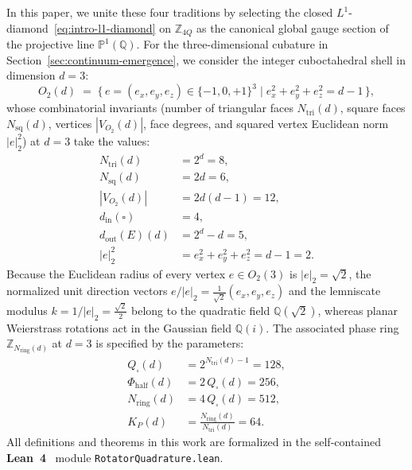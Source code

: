 \documentclass[11pt,a4paper]{article}
\theoremstyle{plain}
\theoremstyle{definition}
\begin{document}
In this paper, we unite these four traditions by selecting the closed $L^1$-diamond~\eqref{eq:intro-l1-diamond} on $\mathbb{Z}_{4Q}$ as the canonical global gauge section of the projective line $\mathbb{P}^1(\mathbb{Q})$. For the three-dimensional cubature in Section~\ref{sec:continuum-emergence}, we consider the integer cuboctahedral shell in dimension $d = 3$:
\begin{equation}
  \label{eq:cuboct-shell-def}
  O_2(d) \;=\; \bigl\{\,e = (e_x, e_y, e_z) \in \{-1, 0, +1\}^3 \;\big|\; e_x^2 + e_y^2 + e_z^2 = d - 1\,\bigr\},
\end{equation}
whose combinatorial invariants (number of triangular faces $N_{\mathrm{tri}}(d)$, square faces $N_{\mathrm{sq}}(d)$, vertices $|V_{O_2}(d)|$, face degrees, and squared vertex Euclidean norm $|e|_2^2$) at $d = 3$ take the values:
\begin{align}
  N_{\mathrm{tri}}(d) &= 2^d = 8, \label{eq:cuboct-triangles} \\
  N_{\mathrm{sq}}(d) &= 2d = 6, \label{eq:cuboct-squares} \\
  |V_{O_2}(d)| &= 2d(d-1) = 12, \label{eq:cuboct-vertices} \\
  d_{\mathrm{in}}(\square) &= 4, \label{eq:cuboct-din} \\
  d_{\mathrm{out}}(E)(d) &= 2^d - d = 5, \label{eq:cuboct-dout} \\
  |e|_2^2 &= e_x^2 + e_y^2 + e_z^2 = d - 1 = 2. \label{eq:cuboct-norm2}
\end{align}
Because the Euclidean radius of every vertex $e \in O_2(3)$ is $|e|_2 = \sqrt{2}$, the normalized unit direction vectors $e / |e|_2 = \frac{1}{\sqrt{2}}(e_x, e_y, e_z)$ and the lemniscate modulus $k = 1/|e|_2 = \frac{\sqrt{2}}{2}$ belong to the quadratic field $\mathbb{Q}(\sqrt{2})$, whereas planar Weierstrass rotations act in the Gaussian field $\mathbb{Q}(i)$. The associated phase ring $\mathbb{Z}_{N_{\mathrm{ring}}(d)}$ at $d = 3$ is specified by the parameters:
\begin{align}
  Q_\square(d) &= 2^{N_{\mathrm{tri}}(d) - 1} = 128, \label{eq:ring-quarter} \\
  \Phi_{\mathrm{half}}(d) &= 2\,Q_\square(d) = 256, \label{eq:ring-half} \\
  N_{\mathrm{ring}}(d) &= 4\,Q_\square(d) = 512, \label{eq:ring-full} \\
  K_P(d) &= \frac{N_{\mathrm{ring}}(d)}{N_{\mathrm{tri}}(d)} = 64. \label{eq:ring-bisector}
\end{align}
All definitions and theorems in this work are formalized in the self-contained \textbf{Lean~4}~\cite{Moura2021} module \texttt{RotatorQuadrature.lean}.
\end{document}
